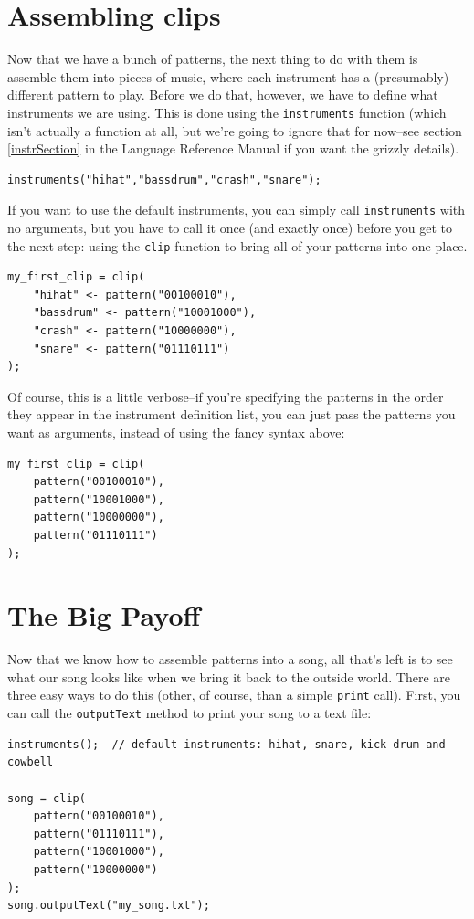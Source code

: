 \section{Assembling clips}\label{tu:clip}

Now that we have a bunch of patterns, the next thing to do with them is assemble them into pieces of music, where each instrument has a (presumably) different pattern to play.  Before we do that, however, we have to define what instruments we are using.  This is done using the {\tt instruments} function (which isn't actually a function at all, but we're going to ignore that for now--see section \ref{instrSection} in the Language Reference Manual if you want the grizzly details).
\begin{lstlisting}
instruments("hihat","bassdrum","crash","snare");
\end{lstlisting}
If you want to use the default instruments, you can simply call {\tt instruments} with no arguments, but you have to call it once (and exactly once) before you get to the next step: using the {\tt clip} function to bring all of your patterns into one place.
\begin{lstlisting}
my_first_clip = clip(
	"hihat" <- pattern("00100010"),
	"bassdrum" <- pattern("10001000"),
	"crash" <- pattern("10000000"),
	"snare" <- pattern("01110111")
);
\end{lstlisting}
Of course, this is a little verbose--if you're specifying the patterns in the order they appear in the instrument definition list, you can just pass the patterns you want as arguments, instead of using the fancy syntax above:
\begin{lstlisting}
my_first_clip = clip(
	pattern("00100010"),
	pattern("10001000"),
	pattern("10000000"),
	pattern("01110111")
);
\end{lstlisting}

\section{The Big Payoff}\label{tu:payoff}
Now that we know how to assemble patterns into a song, all that's left is to see what our song looks like
when we bring it back to the outside world.  There are three easy ways to do this (other, of course, than a simple {\tt print} call).  First, you can call the {\tt outputText} method to print your song to a text file:
\begin{lstlisting}
instruments();  // default instruments: hihat, snare, kick-drum and cowbell

song = clip(
	pattern("00100010"),
	pattern("01110111"),
	pattern("10001000"),
	pattern("10000000")
);
song.outputText("my_song.txt");
\end{lstlisting}

